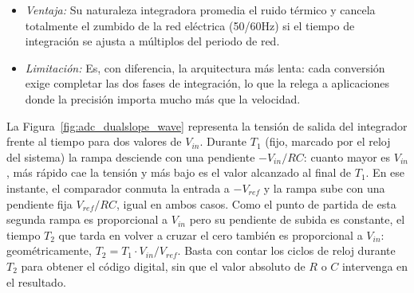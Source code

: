 \begin{itemize}
    \item \emph{Ventaja:} Su naturaleza integradora promedia el ruido térmico y cancela totalmente el zumbido de la red eléctrica (\unit{50/60}{Hz}) si el tiempo de integración se ajusta a múltiplos del periodo de red.
    \item \emph{Limitación:} Es, con diferencia, la arquitectura más lenta: cada conversión exige completar las dos fases de integración, lo que la relega a aplicaciones donde la precisión importa mucho más que la velocidad.
\end{itemize}

\begin{marginfigure}
    \centering
    \shorthandoff{>}
    \caption[Forma de onda del integrador en el ADC de doble rampa.]{Forma de onda del integrador para dos valores de $V_{in}$. $T_1$ es fijo; la pendiente de subida (fijada por $V_{ref}$) es la misma en ambos casos, por lo que $T_2$ crece proporcionalmente a $V_{in}$.}\label{fig:adc_dualslope_wave}
\end{marginfigure}

La Figura~\ref{fig:adc_dualslope_wave} representa la tensión de salida del integrador frente al tiempo para dos valores de $V_{in}$. Durante $T_1$ (fijo, marcado por el reloj del sistema) la rampa desciende con una pendiente $-V_{in}/RC$: cuanto mayor es $V_{in}$, más rápido cae la tensión y más bajo es el valor alcanzado al final de $T_1$. En ese instante, el comparador conmuta la entrada a $-V_{ref}$ y la rampa sube con una pendiente fija $V_{ref}/RC$, igual en ambos casos. Como el punto de partida de esta segunda rampa es proporcional a $V_{in}$ pero su pendiente de subida es constante, el tiempo $T_2$ que tarda en volver a cruzar el cero también es proporcional a $V_{in}$: geométricamente, $T_2 = T_1 \cdot V_{in}/V_{ref}$. Basta con contar los ciclos de reloj durante $T_2$ para obtener el código digital, sin que el valor absoluto de $R$ o $C$ intervenga en el resultado.

